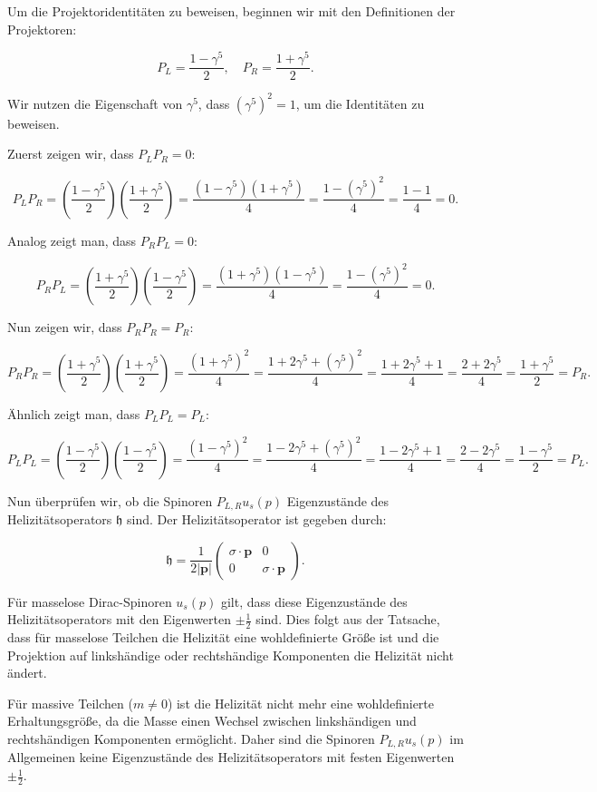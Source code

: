 Um die Projektoridentitäten zu beweisen, beginnen wir mit den Definitionen der Projektoren:

\[
P_L = \frac{1 - \gamma^5}{2}, \quad P_R = \frac{1 + \gamma^5}{2}.
\]

Wir nutzen die Eigenschaft von \(\gamma^5\), dass \((\gamma^5)^2 = 1\), um die Identitäten zu beweisen.

Zuerst zeigen wir, dass \(P_L P_R = 0\):

\[
P_L P_R = \left(\frac{1 - \gamma^5}{2}\right)\left(\frac{1 + \gamma^5}{2}\right) = \frac{(1 - \gamma^5)(1 + \gamma^5)}{4} = \frac{1 - (\gamma^5)^2}{4} = \frac{1 - 1}{4} = 0.
\]

Analog zeigt man, dass \(P_R P_L = 0\):

\[
P_R P_L = \left(\frac{1 + \gamma^5}{2}\right)\left(\frac{1 - \gamma^5}{2}\right) = \frac{(1 + \gamma^5)(1 - \gamma^5)}{4} = \frac{1 - (\gamma^5)^2}{4} = 0.
\]

Nun zeigen wir, dass \(P_R P_R = P_R\):

\[
P_R P_R = \left(\frac{1 + \gamma^5}{2}\right)\left(\frac{1 + \gamma^5}{2}\right) = \frac{(1 + \gamma^5)^2}{4} = \frac{1 + 2\gamma^5 + (\gamma^5)^2}{4} = \frac{1 + 2\gamma^5 + 1}{4} = \frac{2 + 2\gamma^5}{4} = \frac{1 + \gamma^5}{2} = P_R.
\]

Ähnlich zeigt man, dass \(P_L P_L = P_L\):

\[
P_L P_L = \left(\frac{1 - \gamma^5}{2}\right)\left(\frac{1 - \gamma^5}{2}\right) = \frac{(1 - \gamma^5)^2}{4} = \frac{1 - 2\gamma^5 + (\gamma^5)^2}{4} = \frac{1 - 2\gamma^5 + 1}{4} = \frac{2 - 2\gamma^5}{4} = \frac{1 - \gamma^5}{2} = P_L.
\]

Nun überprüfen wir, ob die Spinoren \(P_{L, R} u_s(p)\) Eigenzustände des Helizitätsoperators \(\mathfrak{h}\) sind. Der Helizitätsoperator ist gegeben durch:

\[
\mathfrak{h} = \frac{1}{2|\mathbf{p}|}\left(\begin{array}{cc}
\sigma \cdot \mathbf{p} & 0 \\
0 & \sigma \cdot \mathbf{p}
\end{array}\right).
\]

Für masselose Dirac-Spinoren \(u_s(p)\) gilt, dass diese Eigenzustände des Helizitätsoperators mit den Eigenwerten \(\pm \frac{1}{2}\) sind. Dies folgt aus der Tatsache, dass für masselose Teilchen die Helizität eine wohldefinierte Größe ist und die Projektion auf linkshändige oder rechtshändige Komponenten die Helizität nicht ändert.

Für massive Teilchen (\(m \neq 0\)) ist die Helizität nicht mehr eine wohldefinierte Erhaltungsgröße, da die Masse einen Wechsel zwischen linkshändigen und rechtshändigen Komponenten ermöglicht. Daher sind die Spinoren \(P_{L, R} u_s(p)\) im Allgemeinen keine Eigenzustände des Helizitätsoperators mit festen Eigenwerten \(\pm \frac{1}{2}\).